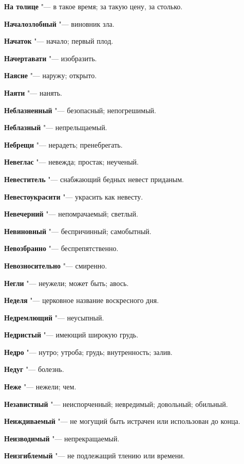 \begin{mymulticols}
\noindent\textbf{На толице} "--- в такое время; за такую цену, за столько. 

\noindent\textbf{Началозлобный} "--- виновник зла. 

\noindent\textbf{Начаток} "--- начало; первый плод. 

\noindent\textbf{Начертавати} "--- изобразить. 

\noindent\textbf{Наясне} "--- наружу; открыто. 

\noindent\textbf{Наяти} "--- нанять. 

\noindent\textbf{Неблазненный} "--- безопасный; непогрешимый. 

\noindent\textbf{Неблазный} "--- непрельщаемый. 

\noindent\textbf{Небрещи} "--- нерадеть; пренебрегать. 

\noindent\textbf{Невеглас} "--- невежда; простак; неученый. 

\noindent\textbf{Невеститель} "--- снабжающий бедных невест приданым. 

\noindent\textbf{Невестоукрасити} "--- украсить как невесту. 

\noindent\textbf{Невечерний} "--- непомрачаемый; светлый. 

\noindent\textbf{Невиновный} "--- беспричинный; самобытный. 

\noindent\textbf{Невозбранно} "--- беспрепятственно. 

\noindent\textbf{Невозносительно} "--- смиренно. 

\noindent\textbf{Негли} "--- неужели; может быть; авось. 

\noindent\textbf{Неделя} "--- церковное название воскресного дня. 

\noindent\textbf{Недремлющий} "--- неусыпный. 

\noindent\textbf{Недристый} "--- имеющий широкую грудь. 

\noindent\textbf{Недро} "--- нутро; утроба; грудь; внутренность; залив. 

\noindent\textbf{Недуг} "--- болезнь. 

\noindent\textbf{Неже} "--- нежели; чем. 

\noindent\textbf{Независтный} "--- неиспорченный; невредимый; довольный; обильный. 

\noindent\textbf{Неиждиваемый} "--- не могущий быть истрачен или использован до конца. 

\noindent\textbf{Неизводимый} "--- непрекращаемый. 

\noindent\textbf{Неизгиблемый} "--- не подлежащий тлению или времени. 


\end{mymulticols}
